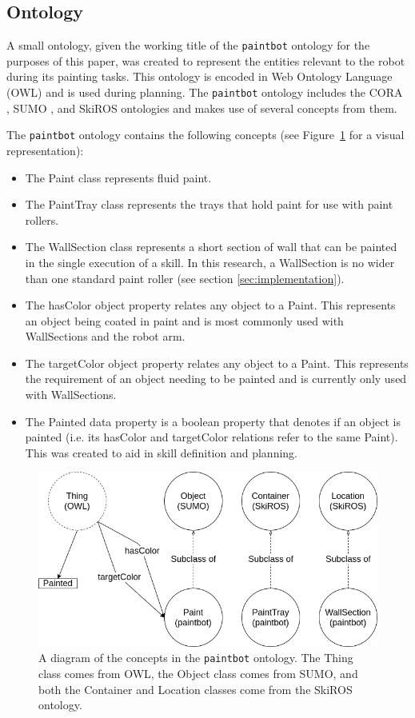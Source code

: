\subsection{Ontology} \label{sec:ontology}
A small ontology, given the working title of the {\tt paintbot} ontology for the purposes of this paper, was created to represent the entities relevant to the robot during its painting tasks. This ontology is encoded in Web Ontology Language (OWL) and is used during planning. The {\tt paintbot} ontology includes the CORA \cite{ieee2015cora}, SUMO \cite{sumo}, and SkiROS ontologies and makes use of several concepts from them.

The {\tt paintbot} ontology contains the following concepts (see Figure~\ref{fig:paintbot_ontology} for a visual representation):
\begin{itemize}
    \item The Paint class represents fluid paint.
    \item The PaintTray class represents the trays that hold paint for use with paint rollers.
    \item The WallSection class represents a short section of wall that can be painted in the single execution of a skill. In this research, a WallSection is no wider than one standard paint roller (see section \ref{sec:implementation}).
    \item The hasColor object property relates any object to a Paint. This represents an object being coated in paint and is most commonly used with WallSections and the robot arm.
    \item The targetColor object property relates any object to a Paint. This represents the requirement of an object needing to be painted and is currently only used with WallSections.
    \item The Painted data property is a boolean property that denotes if an object is painted (i.e. its hasColor and targetColor relations refer to the same Paint). This was created to aid in skill definition and planning.
\end{itemize}

\begin{figure}
    \centering
    \includegraphics[width=0.95\linewidth]{images/ontology.png}
    \caption{A diagram of the concepts in the {\tt paintbot} ontology. The Thing class comes from OWL, the Object class comes from SUMO, and both the Container and Location classes come from the SkiROS ontology.}
    \label{fig:paintbot_ontology}
\end{figure}

